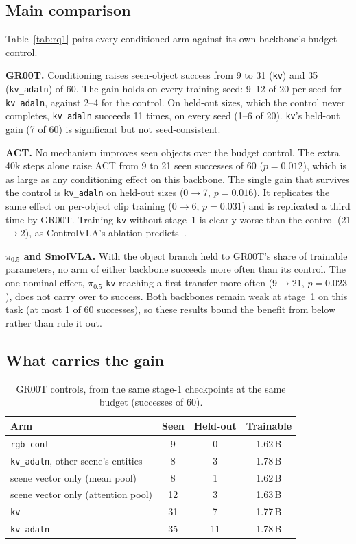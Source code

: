 \documentclass[letterpaper, 10pt, journal, twoside]{IEEEtran}
\newcommand{\arm}[1]{\texttt{#1}}
\begin{document}
\subsection{Main comparison}
Table~\ref{tab:rq1} pairs every conditioned arm against its own backbone's
budget control.

\textbf{GR00T.} Conditioning raises seen-object success from 9 to 31
(\arm{kv}) and 35 (\arm{kv\_adaln}) of 60. The gain holds on every training
seed: 9--12 of 20 per seed for \arm{kv\_adaln}, against 2--4 for the control.
On held-out sizes, which the control never completes, \arm{kv\_adaln}
succeeds 11 times, on every seed (1--6 of 20). \arm{kv}'s held-out gain
(7 of 60) is significant but not seed-consistent.

\textbf{ACT.} No mechanism improves seen objects over the budget control.
The extra 40k steps alone raise ACT from 9 to 21 seen successes of 60
($p=0.012$), which is as large as any conditioning effect on this backbone.
The single gain that survives the control is \arm{kv\_adaln} on held-out
sizes (0$\rightarrow$7, $p=0.016$). It replicates the same effect on
per-object clip training (0$\rightarrow$6, $p=0.031$) and is replicated a
third time by GR00T. Training \arm{kv} without stage~1 is clearly worse than
the control (21$\rightarrow$2), as ControlVLA's ablation
predicts~\cite{li2025controlvla}.

\textbf{$\pi_{0.5}$ and SmolVLA.} With the object branch held to GR00T's
share of trainable parameters, no arm of either backbone succeeds more often
than its control. The one nominal effect, $\pi_{0.5}$ \arm{kv} reaching a
first transfer more often (9$\rightarrow$21, $p=0.023$), does not carry over
to success. Both backbones remain weak at stage~1 on this task (at most 1 of
60 successes), so these results bound the benefit from below rather than
rule it out.

\subsection{What carries the gain}
\label{sec:controls}

\begin{table}[t]
\centering
\caption{GR00T controls, from the same stage-1 checkpoints at the same
budget (successes of 60).}
\label{tab:controls}
\footnotesize
\setlength{\tabcolsep}{4pt}
\begin{tabular}{@{}lccc@{}}
\toprule
Arm & Seen & Held-out & Trainable \\
\midrule
\arm{rgb\_cont}                         & 9  & 0  & 1.62\,B \\
\arm{kv\_adaln}, other scene's entities & 8  & 3  & 1.78\,B \\
scene vector only (mean pool)           & 8  & 1  & 1.62\,B \\
scene vector only (attention pool)      & 12 & 3  & 1.63\,B \\
\arm{kv}                                & 31 & 7  & 1.77\,B \\
\arm{kv\_adaln}                         & 35 & 11 & 1.78\,B \\
\bottomrule
\end{tabular}
\end{table}
\end{document}

